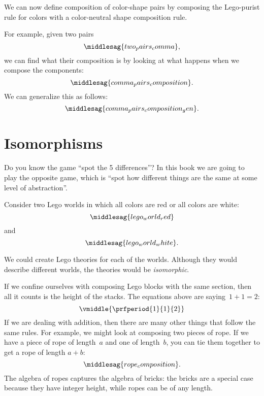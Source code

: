 We can now define composition of color-shape pairs by composing the Lego-purist rule for colors with a color-neutral shape composition rule.

For example, given two pairs
%
\begin{equation}
    \label{eq:two_pairs_comma}
    \middlesag{two_pairs_comma},
\end{equation}
%
we can find what their composition is by looking at what happens when we compose the components:
%
\begin{equation}
    \label{eq:comma_pairs_composition}
    \middlesag{comma_pairs_composition}.
\end{equation}
%
We can generalize this as follows:
%
\begin{equation}
    \label{eq:comma_pairs_composition_gen}
    \middlesag{comma_pairs_composition_gen}.
\end{equation}

\section{Isomorphisms}

Do you know the game ``spot the 5 differences''?
In this book we are going to play the opposite game, which is ``spot how different things are the same at some level of abstraction''.

Consider two Lego worlds in which all colors are red or all colors are white:
\begin{equation}
    \label{eq:lego_world_red}
    \middlesag{lego_world_red}
\end{equation}
%
and
%
\begin{equation}
    \label{eq:lego_world_white}
    \middlesag{lego_world_white}.
\end{equation}

We could create Lego theories for each of the worlds.
Although they would describe different worlds, the theories would be \emph{isomorphic}.

If we confine ourselves with composing Lego blocks with the same section, then all it counts is the height of the stacks.
The equations above are saying~$1+1=2$:
%
\begin{equation}
    \vmiddle{\prfperiod{1}{1}{2}}
\end{equation}
%
If we are dealing with addition, then there are many other things that follow the same rules.
For example, we might look at composing two pieces of rope.
If we have a piece of rope of length~$a$ and one of length~$b$, you can tie them together to get a rope of length $a+b$:
%
\begin{equation}
    \label{eq:rope-compose}
    \middlesag{rope_composition}.
\end{equation}
%
The algebra of ropes captures the algebra of bricks: the bricks are a special case because they have integer height, while ropes can be of any length.

